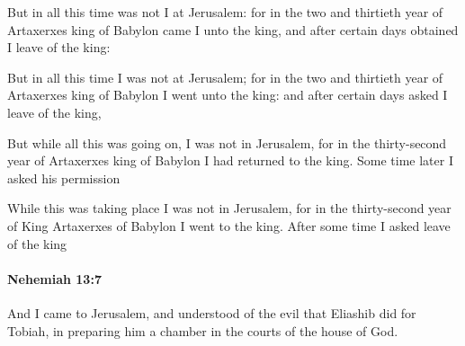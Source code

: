 			But in all this time was not I at Jerusalem: for in the two and thirtieth year of Artaxerxes king of Babylon came I unto the king, and after certain days obtained I leave of the king:

			\begin{versebox}
					\item[BHS] 
					\item[LXX] 
					\item[ASV] But in all this time I was not at Jerusalem; for in the two and thirtieth year of Artaxerxes king of Babylon I went unto the king: and after certain days asked I leave of the king,
					\item[NIV] But while all this was going on, I was not in Jerusalem, for in the thirty-second year of Artaxerxes king of Babylon I had returned to the king. Some time later I asked his permission
					\item[NRSV] While this was taking place I was not in Jerusalem, for in the thirty-second year of King Artaxerxes of Babylon I went to the king. After some time I asked leave of the king
			\end{versebox}

		\paragraph{Nehemiah 13:7} %
			\label{NEHEMIAH-13-7}

			And I came to Jerusalem, and understood of the evil that Eliashib did for Tobiah, in preparing him a chamber in the courts of the house of God.

